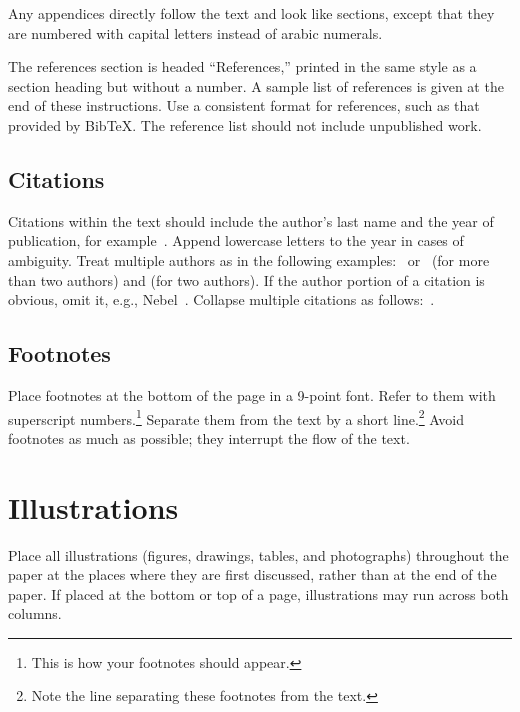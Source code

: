 \documentclass{article}
\theoremstyle{definition}
\begin{document}
Any appendices directly follow the text and look like sections, except
that they are numbered with capital letters instead of arabic
numerals.

The references section is headed ``References,'' printed in the same
style as a section heading but without a number. A sample list of
references is given at the end of these instructions. Use a consistent
format for references, such as that provided by Bib\TeX{}. The reference
list should not include unpublished work.

\subsection{Citations}

Citations within the text should include the author's last name and
the year of publication, for example~\cite{gottlob:nonmon}.  Append
lowercase letters to the year in cases of ambiguity.  Treat multiple
authors as in the following examples:~\cite{abelson-et-al:scheme}
or~\cite{bgf:Lixto} (for more than two authors) and
\cite{brachman-schmolze:kl-one} (for two authors).  If the author
portion of a citation is obvious, omit it, e.g.,
Nebel~.  Collapse multiple citations as
follows:~\cite{gls:hypertrees,levesque:functional-foundations}.
\nocite{abelson-et-al:scheme}
\nocite{bgf:Lixto}
\nocite{brachman-schmolze:kl-one}
\nocite{gottlob:nonmon}
\nocite{gls:hypertrees}
\nocite{levesque:functional-foundations}
\nocite{levesque:belief}
\nocite{nebel:jair-2000}

\subsection{Footnotes}

Place footnotes at the bottom of the page in a 9-point font.  Refer to
them with superscript numbers.\footnote{This is how your footnotes
should appear.} Separate them from the text by a short
line.\footnote{Note the line separating these footnotes from the
text.} Avoid footnotes as much as possible; they interrupt the flow of
the text.

\section{Illustrations}

Place all illustrations (figures, drawings, tables, and photographs)
throughout the paper at the places where they are first discussed,
rather than at the end of the paper. If placed at the bottom or top of
a page, illustrations may run across both columns.
\end{document}
